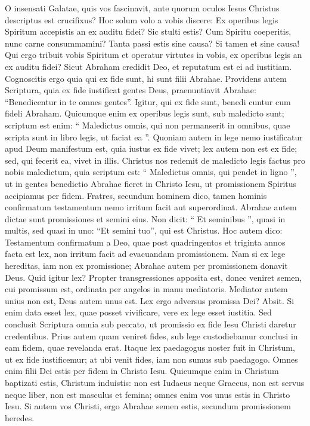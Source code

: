 \begin{biblechapter}
\begin{biblechapter}
\begin{biblechapter}
\verse O insensati Galatae, quis vos fascinavit, ante quorum oculos Iesus Christus descriptus est crucifixus? 
\verse Hoc solum volo a vobis discere: Ex operibus legis Spiritum accepistis an ex auditu fidei? 
\verse Sic stulti estis? Cum Spiritu coeperitis, nunc carne consummamini? 
\verse Tanta passi estis sine causa? Si tamen et sine causa! 
\verse Qui ergo tribuit vobis Spiritum et operatur virtutes in vobis, ex operibus legis an ex auditu fidei?
 \verse Sicut Abraham credidit Deo, et reputatum est ei ad iustitiam. 
\verse Cognoscitis ergo quia qui ex fide sunt, hi sunt filii Abrahae. 
\verse Providens autem Scriptura, quia ex fide iustificat gentes Deus, praenuntiavit Abrahae: “Benedicentur in te omnes gentes”. 
\verse Igitur, qui ex fide sunt, benedi cuntur cum fideli Abraham. 
\verse Quicumque enim ex operibus legis sunt, sub maledicto sunt; scriptum est enim: “ Maledictus omnis, qui non permanserit in omnibus, quae scripta sunt in libro legis, ut faciat ea ”. 
\verse Quoniam autem in lege nemo iustificatur apud Deum manifestum est, quia iustus ex fide vivet; 
\verse lex autem non est ex fide; sed, qui fecerit ea, vivet in illis. 
\verse Christus nos redemit de maledicto legis factus pro nobis maledictum, quia scriptum est: “ Maledictus omnis, qui pendet in ligno ”, 
\verse ut in gentes benedictio Abrahae fieret in Christo Iesu, ut promissionem Spiritus accipiamus per fidem.
 \verse Fratres, secundum hominem dico, tamen hominis confirmatum testamentum nemo irritum facit aut superordinat. 
\verse Abrahae autem dictae sunt promissiones et semini eius. Non dicit: “ Et seminibus ”, quasi in multis, sed quasi in uno: “Et semini tuo”, qui est Christus. 
\verse Hoc autem dico: Testamentum confirmatum a Deo, quae post quadringentos et triginta annos facta est lex, non irritum facit ad evacuandam promissionem. 
\verse Nam si ex lege hereditas, iam non ex promissione; Abrahae autem per promissionem donavit Deus.
 \verse Quid igitur lex? Propter transgressiones apposita est, donec veniret semen, cui promissum est, ordinata per angelos in manu mediatoris. 
\verse Mediator autem unius non est, Deus autem unus est. 
\verse Lex ergo adversus promissa Dei? Absit. Si enim data esset lex, quae posset vivificare, vere ex lege esset iustitia. 
\verse Sed conclusit Scriptura omnia sub peccato, ut promissio ex fide Iesu Christi daretur credentibus.
 \verse Prius autem quam veniret fides, sub lege custodiebamur conclusi in eam fidem, quae revelanda erat. 
\verse Itaque lex paedagogus noster fuit in Christum, ut ex fide iustificemur; 
\verse at ubi venit fides, iam non sumus sub paedagogo. 
 \verse Omnes enim filii Dei estis per fidem in Christo Iesu. 
\verse Quicumque enim in Christum baptizati estis, Christum induistis: 
\verse non est Iudaeus neque Graecus, non est servus neque liber, non est masculus et femina; omnes enim vos unus estis in Christo Iesu. 
\verse Si autem vos Christi, ergo Abrahae semen estis, secundum promissionem heredes.
 

\end{biblechapter}
\end{biblechapter}
\end{biblechapter}
